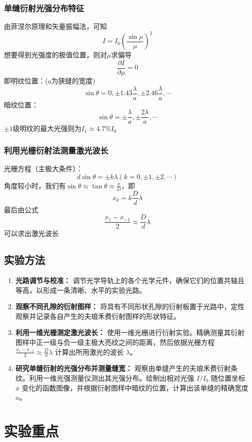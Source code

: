 \documentclass[10pt,a4paper]{ctexart}
\newcommand{\myspace}[1]{\par\vspace{#1\baselineskip}} %
\begin{document}
\subsubsection{单缝衍射光强分布特征}
由菲涅尔原理和矢量振幅法，可知\[
I = I_0 (\frac{\sin \mu}{\mu})^2
\]
想要得到光强度的极值位置，则对$\mu$求偏导
\[
\frac{\partial I}{\partial \mu} = 0
\]
即明纹位置：($a$为狭缝的宽度)
\[
\sin\theta = 0, \pm 1.43\frac{\lambda}{a}, \pm 2.46\frac{\lambda}{a}, \cdots
\]
暗纹位置：
\[
\sin\theta = \pm \frac{\lambda}{a}, \pm \frac{2\lambda}{a}, \cdots
\]
$\pm 1$级明纹的最大光强则为$I_1 \approx 4.7\% I_0$



\subsubsection{利用光栅衍射法测量激光波长}
光栅方程（主极大条件）：
\[
d\sin \theta = \pm k\lambda(k = 0, \pm 1, \pm 2, \cdots)
\]
角度较小时，我们有$\sin\theta \approx \tan \theta \approx \frac{x}{D}$，即
\[
x_k = k\frac{D}{d}\lambda
\]
最后由公式\[\frac{x_1 - x_{-1}}{2} \approx \frac{D}{d}\lambda\]
可以求出激光波长
\subsection{实验方法}
\begin{enumerate}
    \item \textbf{光路调节与校准：}
    调节光学导轨上的各个光学元件，确保它们的位置共轴且等高，以形成一条清晰、水平的实验光路。

    \item \textbf{观察不同孔隙的衍射图样：}
    将具有不同形状孔隙的衍射板置于光路中，定性观察并记录各自产生的夫琅禾费衍射图样的形状特征。

    \item \textbf{利用一维光栅测定激光波长：}
    使用一维光栅进行衍射实验。精确测量其衍射图样中正一级与负一级主极大亮纹之间的距离，然后依据光栅方程 $\frac{x_1 - x_{-1}}{2} \approx \frac{D}{d}\lambda$ 计算出所用激光的波长 $\lambda$。

    \item \textbf{研究单缝衍射的光强分布并测量缝宽：}
    观察由单缝产生的夫琅禾费衍射条纹。利用一维光强测量仪测出其光强分布。绘制出相对光强 $I/I_0$ 随位置坐标 $x$ 变化的函数图像，并根据衍射图样中暗纹的位置，计算出该单缝的精确宽度 $a$。

\end{enumerate}
\myspace{2}
    
    \section{实验重点}
    
\end{document}
